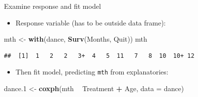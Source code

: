 \documentclass[ignorenonframetext,]{beamer}
\newenvironment{Shaded}{\begin{snugshade}}{\end{snugshade}}
\newcommand{\DataTypeTok}[1]{\textcolor[rgb]{0.13,0.29,0.53}{#1}}
\newcommand{\FloatTok}[1]{\textcolor[rgb]{0.00,0.00,0.81}{#1}}
\newcommand{\KeywordTok}[1]{\textcolor[rgb]{0.13,0.29,0.53}{\textbf{#1}}}
\newcommand{\NormalTok}[1]{#1}
\newcommand{\OperatorTok}[1]{\textcolor[rgb]{0.81,0.36,0.00}{\textbf{#1}}}
\newcommand{\StringTok}[1]{\textcolor[rgb]{0.31,0.60,0.02}{#1}}
\providecommand{\tightlist}{%
  \setlength{\itemsep}{0pt}\setlength{\parskip}{0pt}}
\begin{document}
\begin{frame}[fragile]{Examine response and fit model}
\protect\hypertarget{examine-response-and-fit-model}{}

\begin{itemize}
\tightlist
\item
  Response variable (has to be outside data frame):
\end{itemize}

\small

\begin{Shaded}
\begin{Highlighting}[]
\NormalTok{mth <-}\StringTok{ }\KeywordTok{with}\NormalTok{(dance, }\KeywordTok{Surv}\NormalTok{(Months, Quit))}
\NormalTok{mth}
\end{Highlighting}
\end{Shaded}

\begin{verbatim}
##  [1]  1   2   2   3+  4   5  11   7   8  10  10+ 12
\end{verbatim}

\normalsize

\begin{itemize}
\tightlist
\item
  Then fit model, predicting \texttt{mth} from explanatories:
\end{itemize}

\begin{Shaded}
\begin{Highlighting}[]
\NormalTok{dance}\FloatTok{.1}\NormalTok{ <-}\StringTok{ }\KeywordTok{coxph}\NormalTok{(mth }\OperatorTok{~}\StringTok{ }\NormalTok{Treatment }\OperatorTok{+}\StringTok{ }\NormalTok{Age, }\DataTypeTok{data =}\NormalTok{ dance)}
\end{Highlighting}
\end{Shaded}

\end{frame}
\end{document}
